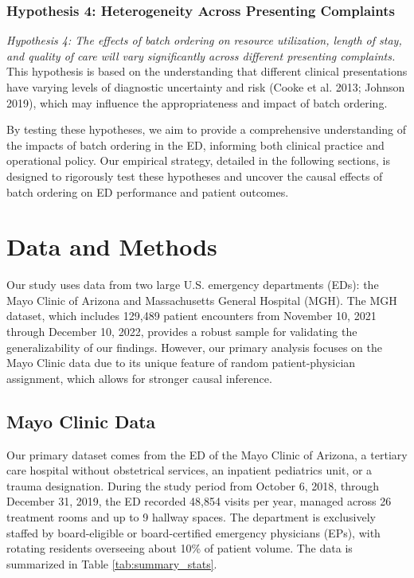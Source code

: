 \documentclass{article}
\begin{document}
\hypertarget{hypothesis-4-heterogeneity-across-presenting-complaints}{%
\subsubsection{Hypothesis 4: Heterogeneity Across Presenting
Complaints}\label{hypothesis-4-heterogeneity-across-presenting-complaints}}

\emph{Hypothesis 4: The effects of batch ordering on resource
utilization, length of stay, and quality of care will vary significantly
across different presenting complaints.} This hypothesis is based on the
understanding that different clinical presentations have varying levels
of diagnostic uncertainty and risk (Cooke et al. 2013; Johnson 2019),
which may influence the appropriateness and impact of batch ordering.

By testing these hypotheses, we aim to provide a comprehensive
understanding of the impacts of batch ordering in the ED, informing both
clinical practice and operational policy. Our empirical strategy,
detailed in the following sections, is designed to rigorously test these
hypotheses and uncover the causal effects of batch ordering on ED
performance and patient outcomes.

\hypertarget{data-and-methods}{%
\section{Data and Methods}\label{data-and-methods}}

Our study uses data from two large U.S. emergency departments (EDs): the
Mayo Clinic of Arizona and Massachusetts General Hospital (MGH). The MGH
dataset, which includes 129,489 patient encounters from November 10,
2021 through December 10, 2022, provides a robust sample for validating
the generalizability of our findings. However, our primary analysis
focuses on the Mayo Clinic data due to its unique feature of random
patient-physician assignment, which allows for stronger causal
inference.

\hypertarget{mayo-clinic-data}{%
\subsection{Mayo Clinic Data}\label{mayo-clinic-data}}

Our primary dataset comes from the ED of the Mayo Clinic of Arizona, a
tertiary care hospital without obstetrical services, an inpatient
pediatrics unit, or a trauma designation. During the study period from
October 6, 2018, through December 31, 2019, the ED recorded 48,854
visits per year, managed across 26 treatment rooms and up to 9 hallway
spaces. The department is exclusively staffed by board-eligible or
board-certified emergency physicians (EPs), with rotating residents
overseeing about 10\% of patient volume. The data is summarized in Table
\ref{tab:summary_stats}.
\end{document}
